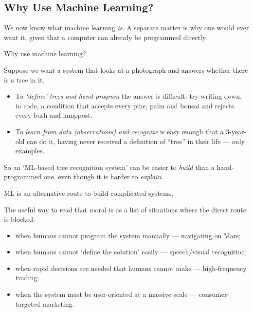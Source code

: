 \subsection{Why Use Machine Learning?}

We now know what machine learning \emph{is}. A separate matter is why one would
ever want it, given that a computer can already be programmed directly.

\begin{question}
    Why use machine learning?
\end{question}

\begin{eg}
    Suppose we want a system that looks at a photograph and answers whether
    there is a tree in it.
    \begin{itemize}
        \item To \emph{`define' trees and hand-program} the answer is difficult:
            try writing down, in code, a condition that accepts every pine,
            palm and bonsai and rejects every bush and lamppost.
        \item To \emph{learn from data (observations) and recognize} is easy
            enough that a 3-year-old can do it, having never received a
            definition of ``tree'' in their life --- only examples.
    \end{itemize}
    So an `ML-based tree recognition system' can be easier to \emph{build} than
    a hand-programmed one, even though it is harder to \emph{explain}.
\end{eg}

\begin{moral}
    ML is an alternative route to build complicated systems.
\end{moral}

The useful way to read that moral is as a list of situations where the direct
route is blocked:

\begin{itemize}
    \item when humans cannot program the system manually --- navigating on Mars;
    \item when humans cannot `define the solution' easily ---
        speech/visual recognition;
    \item when rapid decisions are needed that humans cannot make ---
        high-frequency trading;
    \item when the system must be user-oriented at a massive scale ---
        consumer-targeted marketing.
\end{itemize}

